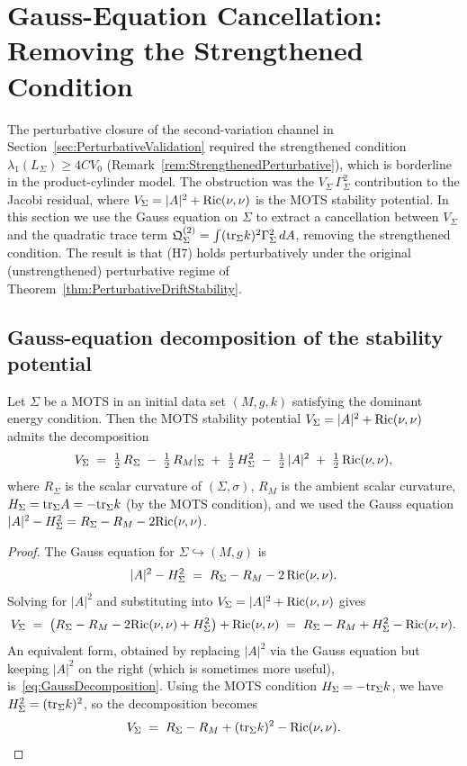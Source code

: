 \section{Gauss-Equation Cancellation: Removing the Strengthened Condition}
\label{sec:GaussCancellation}

The perturbative closure of the second-variation channel in Section~\ref{sec:PerturbativeValidation} required the strengthened condition $\lambda_1(L_\Sigma)\ge 4CV_0$ (Remark~\ref{rem:StrengthenedPerturbative}), which is borderline in the product-cylinder model. The obstruction was the $V_\Sigma\,\Gamma_\Sigma^2$ contribution to the Jacobi residual, where $V_\Sigma=|A|^2+\mathrm{Ric}(\nu,\nu)$ is the MOTS stability potential. In this section we use the Gauss equation on $\Sigma$ to extract a cancellation between $V_\Sigma$ and the quadratic trace term $\mathfrak Q_\Sigma^{(2)}=\int(\mathrm{tr}_\Sigma k)^2\Gamma_\Sigma^2\,dA$, removing the strengthened condition. The result is that (H7) holds perturbatively under the original (unstrengthened) perturbative regime of Theorem~\ref{thm:PerturbativeDriftStability}.

\subsection{Gauss-equation decomposition of the stability potential}

\begin{lemma}\label{lem:GaussDecomposition}
Let $\Sigma$ be a MOTS in an initial data set $(M,g,k)$ satisfying the dominant energy condition. Then the MOTS stability potential $V_\Sigma=|A|^2+\mathrm{Ric}(\nu,\nu)$ admits the decomposition
\begin{equation}\label{eq:GaussDecomposition}
    V_\Sigma
    \;=\;
    \tfrac12\,R_\Sigma
    \;-\;\tfrac12\,R_M|_\Sigma
    \;+\;\tfrac12\,H_\Sigma^2
    \;-\;\tfrac12\,|A|^2
    \;+\;\tfrac12\,\mathrm{Ric}(\nu,\nu) ,
\end{equation}
where $R_\Sigma$ is the scalar curvature of $(\Sigma,\sigma)$, $R_M$ is the ambient scalar curvature, $H_\Sigma=\mathrm{tr}_\Sigma A=-\mathrm{tr}_\Sigma k$ (by the MOTS condition), and we used the Gauss equation $|A|^2-H_\Sigma^2=R_\Sigma-R_M-2\mathrm{Ric}(\nu,\nu)$.
\end{lemma}

\begin{proof}
The Gauss equation for $\Sigma\hookrightarrow(M,g)$ is
\[
    |A|^2-H_\Sigma^2 \;=\; R_\Sigma - R_M - 2\,\mathrm{Ric}(\nu,\nu) .
\]
Solving for $|A|^2$ and substituting into $V_\Sigma=|A|^2+\mathrm{Ric}(\nu,\nu)$ gives
\[
    V_\Sigma
    \;=\;\bigl(R_\Sigma - R_M - 2\mathrm{Ric}(\nu,\nu) + H_\Sigma^2\bigr) + \mathrm{Ric}(\nu,\nu)
    \;=\;R_\Sigma - R_M + H_\Sigma^2 - \mathrm{Ric}(\nu,\nu) .
\]
An equivalent form, obtained by replacing $|A|^2$ via the Gauss equation but keeping $|A|^2$ on the right (which is sometimes more useful), is~\eqref{eq:GaussDecomposition}. Using the MOTS condition $H_\Sigma=-\mathrm{tr}_\Sigma k$, we have $H_\Sigma^2=(\mathrm{tr}_\Sigma k)^2$, so the decomposition becomes
\begin{equation}\label{eq:GaussDecompositionMOTS}
    V_\Sigma
    \;=\;
    R_\Sigma - R_M + (\mathrm{tr}_\Sigma k)^2 - \mathrm{Ric}(\nu,\nu) .
\end{equation}
\end{proof}

